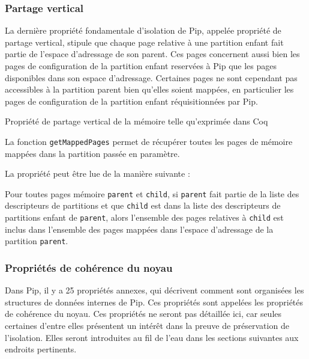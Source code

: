 			\subsubsection{Partage vertical}

			La dernière propriété fondamentale d'isolation de Pip, appelée propriété de partage vertical, stipule que chaque page relative à une partition enfant fait partie de l'espace d'adressage de son parent. Ces pages concernent aussi bien les pages de configuration de la partition enfant reservées à Pip que les pages disponibles dans son espace d'adressage. Certaines pages ne sont cependant pas accessibles à la partition parent bien qu'elles soient mappées, en particulier les pages de configuration de la partition enfant réquisitionnées par Pip.

			\begin{listing}[!ht]
				\caption{Propriété de partage vertical de la mémoire telle qu'exprimée dans Coq}
				\label{code:vertical_sharing}
			\end{listing}

			La fonction \texttt{getMappedPages} permet de récupérer toutes les pages de mémoire mappées dans la partition passée en paramètre.

			La propriété peut être lue de la manière suivante :

			\begin{theorem}
				Pour toutes pages mémoire \texttt{parent} et \texttt{child}, si \texttt{parent} fait partie de la liste des descripteurs de partitions et que \texttt{child} est dans la liste des descripteurs de partitions enfant de \texttt{parent}, alors l'ensemble des pages relatives à \texttt{child} est inclus dans l'ensemble des pages mappées dans l'espace d'adressage de la partition \texttt{parent}.
			\end{theorem}

			\subsubsection{Propriétés de cohérence du noyau}

			Dans Pip, il y a 25 propriétés annexes, qui décrivent comment sont organisées les structures de données internes de Pip. Ces propriétés sont appelées les propriétés de cohérence du noyau. Ces propriétés ne seront pas détaillée ici, car seules certaines d'entre elles présentent un intérêt dans la preuve de préservation de l'isolation. Elles seront introduites au fil de l'eau dans les sections suivantes aux endroits pertinents.

